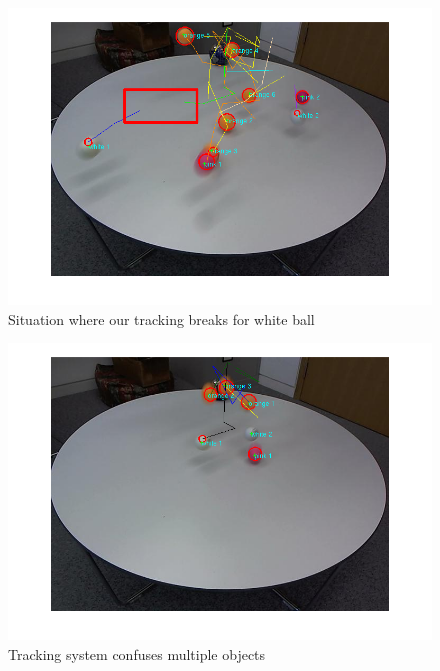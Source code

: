\documentclass[12pt,a4paper]{article}
\begin{document}
\begin{figure}
	\centering
    \includegraphics[width=140mm]{mistakes/tracking_breaks.png}
    \caption{Situation where our tracking breaks for white ball}
	\label{my-label07}
\end{figure} 

\begin{figure}
	\centering
    \includegraphics[width=140mm]{mistakes/frame_31_interobject_tracking_mismatches.png}
    \caption{Tracking system confuses multiple objects}
	\label{my-label08}
\end{figure} 
\end{document}
